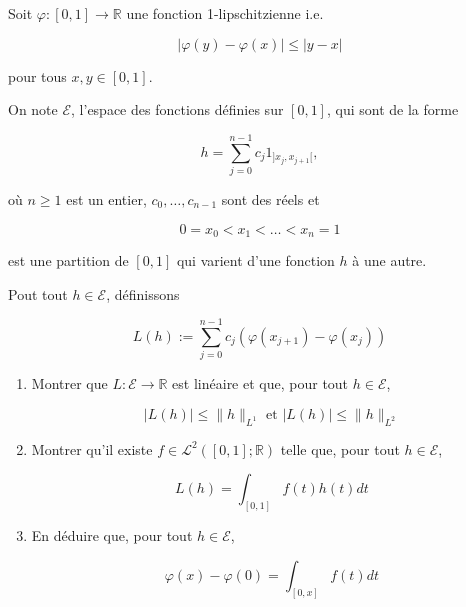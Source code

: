 \documentclass[10pt,a4paper,oneside]{article}
\newenvironment{exercice}[1][Exercice]{\begin{trivlist}
\item[\hskip \labelsep {\bfseries #1}]}{\end{trivlist}}
\begin{document}
\begin{exercice}
Soit $\varphi : [0,1] \to \mathbb{R}$ une fonction 1-lipschitzienne i.e.

\[ |\varphi(y) - \varphi(x)| \leq |y -x| \]

pour tous $x,y \in [0,1]$.

On note $\mathcal{E}$, l'espace des fonctions définies sur $[0,1]$, qui sont de la forme

\[ h = \sum_{j = 0}^{n - 1} c_j 1_{]x_j,x_{j + 1}[}, \]

où $n \geq 1$ est un entier, $c_0, \ldots, c_{n - 1}$ sont des réels et

\[ 0 = x_0 < x_1 < \ldots < x_n = 1 \]

est une partition de $[0,1]$ qui varient d'une fonction $h$ à une autre.

Pout tout $h \in \mathcal{E}$, définissons

\[ L(h) := \sum_{j = 0}^{n - 1} c_j (\varphi(x_{j + 1}) - \varphi(x_j)) \]

\begin{enumerate}
\item
Montrer que $L: \mathcal{E} \to \mathbb{R}$ est linéaire et que, pour tout $h \in \mathcal{E}$,

\[ |L(h)| \leq \| h \|_{L^1} \text{ et } |L(h)| \leq \| h \|_{L^2} \]

\item
Montrer qu'il existe $f \in \mathcal{L}^2([0,1];\mathbb{R})$ telle que, pour tout $h \in \mathcal{E}$,

\[ L(h) = \int_{[0,1]}f(t)h(t)dt \]

\item
En déduire que, pour tout $h \in \mathcal{E}$,

\[ \varphi(x) - \varphi(0) = \int_{[0,x]} f(t)dt \]

\end{enumerate}
\end{exercice}
\end{document}
